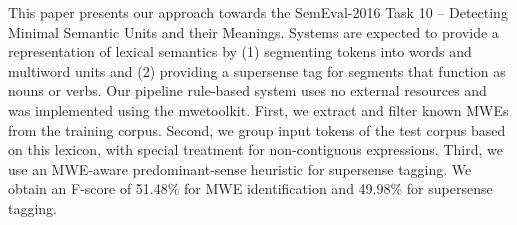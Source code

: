 This paper presents our approach towards the SemEval-2016 Task 10 -- Detecting Minimal Semantic Units and their Meanings. Systems are expected to provide a representation of lexical semantics by (1) segmenting tokens into words and multiword units and (2) providing a supersense tag for segments that function as nouns or verbs. Our pipeline rule-based system uses no external resources and was implemented using the mwetoolkit. First, we extract and filter known MWEs from the training corpus. Second, we group input tokens of the test corpus based on this lexicon, with special treatment for non-contiguous expressions. Third, we use an MWE-aware predominant-sense heuristic for supersense tagging. We obtain an F-score of 51.48\% for MWE identification and 49.98\% for supersense tagging.
